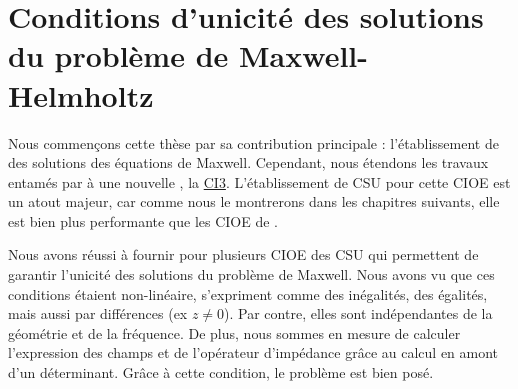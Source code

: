 \chapter[Unicité des solutions de Maxwell]{Conditions d'unicité des solutions du problème de Maxwell-Helmholtz}
\label{sec:csu}
\minitoc
\newpage
{}
Nous commençons cette thèse par sa contribution principale : l'établissement de  des solutions des équations de Maxwell.
Cependant, nous étendons les travaux entamés par \cite{stupfel_sufficient_2011} à une nouvelle , la \hyperlink{ci3}{CI3}. L'établissement de CSU pour cette CIOE est un atout majeur, car comme nous le montrerons dans les chapitres suivants, elle est bien plus performante que les CIOE de \cite{stupfel_sufficient_2011}.





Nous avons réussi à fournir pour plusieurs CIOE des CSU qui permettent de garantir l'unicité des solutions du problème de Maxwell. Nous avons vu que ces conditions étaient non-linéaire, s'expriment comme des inégalités, des égalités, mais aussi par différences (ex \(z\not=0\)). Par contre, elles sont indépendantes de la géométrie et de la fréquence.
De plus, nous sommes en mesure de calculer l'expression des champs et de l'opérateur d'impédance grâce au calcul en amont d'un déterminant. Grâce à cette condition, le problème est bien posé.